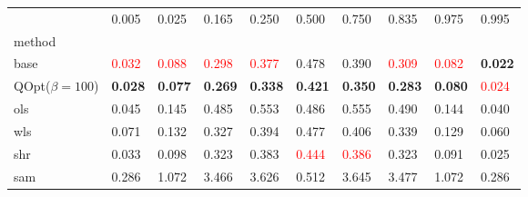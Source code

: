 \begin{tabular}{llllllllll}
\toprule
 & 0.005 & 0.025 & 0.165 & 0.250 & 0.500 & 0.750 & 0.835 & 0.975 & 0.995 \\
method &  &  &  &  &  &  &  &  &  \\
\midrule
base & \textcolor{red}{0.032} & \textcolor{red}{0.088} & \textcolor{red}{0.298} & \textcolor{red}{0.377} & 0.478 & 0.390 & \textcolor{red}{0.309} & \textcolor{red}{0.082} & \textbf{0.022} \\
\midrule
QOpt($\beta=100$) & \textbf{0.028} & \textbf{0.077} & \textbf{0.269} & \textbf{0.338} & \textbf{0.421} & \textbf{0.350} & \textbf{0.283} & \textbf{0.080} & \textcolor{red}{0.024} \\
ols & 0.045 & 0.145 & 0.485 & 0.553 & 0.486 & 0.555 & 0.490 & 0.144 & 0.040 \\
wls & 0.071 & 0.132 & 0.327 & 0.394 & 0.477 & 0.406 & 0.339 & 0.129 & 0.060 \\
shr & 0.033 & 0.098 & 0.323 & 0.383 & \textcolor{red}{0.444} & \textcolor{red}{0.386} & 0.323 & 0.091 & 0.025 \\
sam & 0.286 & 1.072 & 3.466 & 3.626 & 0.512 & 3.645 & 3.477 & 1.072 & 0.286 \\
\bottomrule
\end{tabular}